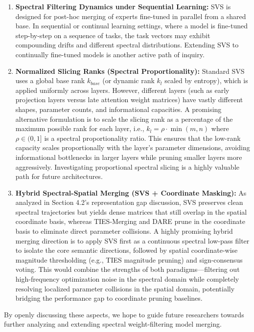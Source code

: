 \begin{enumerate}
    Applying and validating SVS on sequential decoder-only language models, where parameter interference behaves differently than in encoder-only vision networks, is an important direction for future research.
    \item \textbf{Spectral Filtering Dynamics under Sequential Learning:} SVS is designed for post-hoc merging of experts fine-tuned in parallel from a shared base. In sequential or continual learning settings, where a model is fine-tuned step-by-step on a sequence of tasks, the task vectors may exhibit compounding drifts and different spectral distributions. Extending SVS to continually fine-tuned models is another active path of inquiry.
    \item \textbf{Normalized Slicing Ranks (Spectral Proportionality):} Standard SVS uses a global base rank $k_{base}$ (or dynamic rank $k_l$ scaled by entropy), which is applied uniformly across layers. However, different layers (such as early projection layers versus late attention weight matrices) have vastly different shapes, parameter counts, and informational capacities. A promising alternative formulation is to scale the slicing rank as a percentage of the maximum possible rank for each layer, i.e., $k_l = \rho \cdot \min(m, n)$ where $\rho \in (0, 1]$ is a spectral proportionality ratio. This ensures that the low-rank capacity scales proportionally with the layer's parameter dimensions, avoiding informational bottlenecks in larger layers while pruning smaller layers more aggressively. Investigating proportional spectral slicing is a highly valuable path for future architectures.
    \item \textbf{Hybrid Spectral-Spatial Merging (SVS + Coordinate Masking):} As analyzed in Section 4.2's representation gap discussion, SVS preserves clean spectral trajectories but yields dense matrices that still overlap in the spatial coordinate basis, whereas TIES-Merging and DARE prune in the coordinate basis to eliminate direct parameter collisions. A highly promising hybrid merging direction is to apply SVS first as a continuous spectral low-pass filter to isolate the core semantic directions, followed by spatial coordinate-wise magnitude thresholding (e.g., TIES magnitude pruning) and sign-consensus voting. This would combine the strengths of both paradigms---filtering out high-frequency optimization noise in the spectral domain while completely resolving localized parameter collisions in the spatial domain, potentially bridging the performance gap to coordinate pruning baselines.
\end{enumerate}
By openly discussing these aspects, we hope to guide future researchers towards further analyzing and extending spectral weight-filtering model merging.

